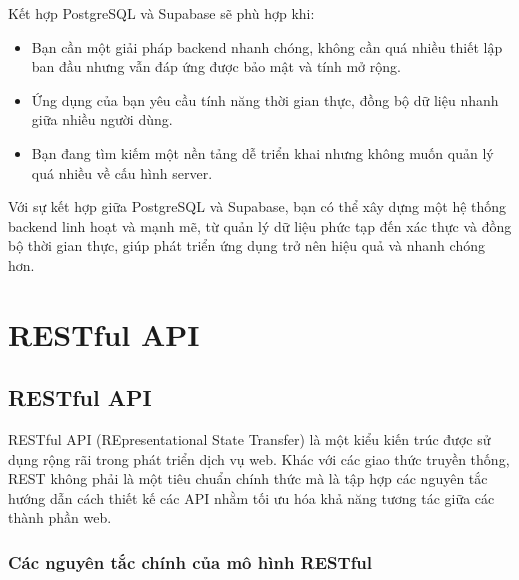 \documentclass[a4paper]{report}
\begin{document}
Kết hợp PostgreSQL và Supabase sẽ phù hợp khi:

\begin{itemize}
    \item Bạn cần một giải pháp backend nhanh chóng, không cần quá nhiều thiết lập ban đầu nhưng vẫn đáp ứng được bảo mật và tính mở rộng.
    
    \item Ứng dụng của bạn yêu cầu tính năng thời gian thực, đồng bộ dữ liệu nhanh giữa nhiều người dùng.
    
    \item Bạn đang tìm kiếm một nền tảng dễ triển khai nhưng không muốn quản lý quá nhiều về cấu hình server.
\end{itemize}

\medskip

Với sự kết hợp giữa PostgreSQL và Supabase, bạn có thể xây dựng một hệ thống backend linh hoạt và mạnh mẽ, từ quản lý dữ liệu phức tạp đến xác thực và đồng bộ thời gian thực, giúp phát triển ứng dụng trở nên hiệu quả và nhanh chóng hơn.


\section{RESTful API}

\subsection{RESTful API}

RESTful API (REpresentational State Transfer) là một kiểu kiến trúc được sử dụng rộng rãi trong phát triển dịch vụ web. Khác với các giao thức truyền thống, REST không phải là một tiêu chuẩn chính thức mà là tập hợp các nguyên tắc hướng dẫn cách thiết kế các API nhằm tối ưu hóa khả năng tương tác giữa các thành phần web.


\subsubsection{Các nguyên tắc chính của mô hình RESTful}
\end{document}
